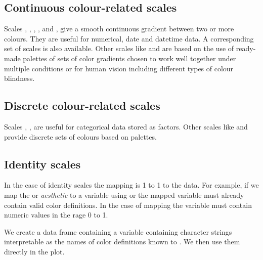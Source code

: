 \documentclass[krantz2]{krantz}\usepackage{knitr}%
\begin{document}
\subsection{Continuous colour-related scales}
\sloppy
Scales , , ,  ,  and , give a smooth continuous gradient between two or more colours. They are useful for numerical, date and datetime data. A corresponding set of  scales is also available. Other scales like  and  are based on the use of ready-made palettes of sets of color gradients chosen to work well together under multiple conditions or for human vision including different types of colour blindness.

\subsection{Discrete colour-related scales}
\sloppy
Scales , ,  are useful for categorical data stored as factors. Other scales like  and  provide discrete sets of colours based on palettes.

\subsection{Identity scales}
In the case of identity scales the mapping is 1 to 1 to the data. For example, if we map the  or  \emph{aesthetic} to a variable using  or  the mapped variable must already contain valid color definitions. In the case of mapping  the variable must contain numeric values in the rage 0 to 1.

We create a data frame containing a variable  containing character strings interpretable as the names of color definitions known to \Rlang. We then use them directly in the plot.
\end{document}
